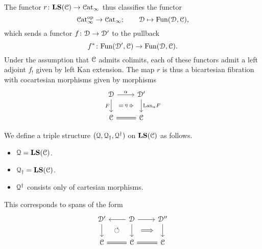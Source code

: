 \documentclass[main.tex]{subfiles}
\begin{document}
The functor $r\colon \mathbf{LS}(\mathcal{C}) \to \mathcal{C}\mathrm{at}_{\infty}$ thus classifies the functor
\begin{equation*}
  \mathcal{C}\mathrm{at}_{\infty}^{\mathrm{op}} \to \mathcal{C}\mathrm{at}_{\infty};\qquad \mathcal{D} \mapsto \mathrm{Fun}(\mathcal{D}, \mathcal{C}),
\end{equation*}
which sends a functor $f\colon \mathcal{D} \to \mathcal{D}'$ to the pullback
\begin{equation*}
  f^{*}\colon \mathrm{Fun}(\mathcal{D}', \mathcal{C}) \to \mathrm{Fun}(\mathcal{D}, \mathcal{C}).
\end{equation*}
Under the assumption that $\mathcal{C}$ admits colimits, each of these functors admit a left adjoint $f_{!}$ given by left Kan extension. The map $r$ is thus a bicartesian fibration with cocartesian morphisms given by morphisms
\begin{equation*}
  \begin{tikzcd}
    \category{D}
    \arrow[r, "\alpha"]
    \arrow[d, ""{name=L, right}, "F"{left}]
    & \category{D}'
    \arrow[d, ""{name=R, left}, "\Lan_{\alpha}F"{right}]
    \\
    \category{C}
    & \category{C}
    \arrow[l, equals]
    \arrow[Rightarrow, from=L, to=R, shorten=1.5ex, "\eta"{description}]
  \end{tikzcd}
\end{equation*}

We define a triple structure $(\mathcal{Q}, \mathcal{Q}_{\dagger}, \mathcal{Q}^{\dagger})$ on $\mathbf{LS}(\mathcal{C})$ as follows.
\begin{itemize}
  \item $\mathcal{Q} = \mathbf{LS}(\mathcal{C})$.

  \item $\mathcal{Q}_{\dagger} = \mathbf{LS}(\mathcal{C})$.

  \item $\mathcal{Q}^{\dagger}$ consists only of cartesian morphisms.
\end{itemize}

This corresponds to spans of the form
\begin{equation*}
  \begin{tikzcd}
    \category{D}'
    \arrow[d, ""{name=L, right}]
    & \category{D}
    \arrow[d, ""{name=ML, left}, ""{name=MR, right}]
    \arrow[l, swap]
    \arrow[r]
    & \category{D}''
    \arrow[d, ""{name=R, left}]
    \\
    \category{C}
    \arrow[r, equals]
    &\category{C}
    & \category{C}
    \arrow[l, equals]
    \arrow[Rightarrow, from=MR, to=R, shorten=2ex]
    \arrow[Rightarrow, from=ML, to=L, phantom, "\circlearrowleft"{description}]
  \end{tikzcd}
\end{equation*}
\end{document}
